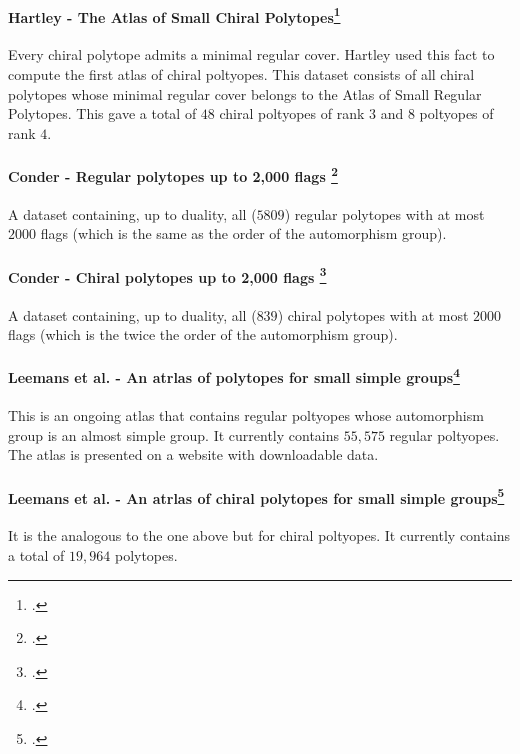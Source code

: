 \paragraph{Hartley - The Atlas of Small Chiral Polytopes\footcite{Hartley_2006_AtlasSmallChiral}} Every chiral polytope admits a minimal regular cover. Hartley used this fact to compute the first atlas of chiral poltyopes. This dataset consists of all chiral polytopes whose minimal regular cover belongs to the Atlas of Small Regular Polytopes. This gave a total of $48$ chiral poltyopes of rank $3$ and $8$ poltyopes of rank $4$.

\paragraph{Conder - Regular polytopes up to 2,000 flags \footcite{Conder_2012_RegularPolytopes2000}} A dataset containing, up to duality, all ($5809$) regular polytopes with at most $2000$ flags (which is the same as the order of the automorphism group).

\paragraph{Conder - Chiral polytopes up to 2,000 flags \footcite{Conder_2012_ChiralPolytopes2000}} A dataset containing, up to duality, all ($839$) chiral polytopes with at most $2000$ flags (which is the twice the order  of the automorphism group).


\paragraph{Leemans et al. - An atrlas of polytopes for small simple groups\footcite{LeemansLaurenceConnorMixerMulpas__AtlasPolytopesSmall}} This is an ongoing atlas that contains regular poltyopes whose automorphism group is an almost simple group. It currently contains $55,575$ regular poltyopes. The atlas is presented on a website with downloadable data.

\paragraph{Leemans et al. - An atrlas of chiral polytopes for small simple groups\footcite{HartleyHubardLeemans__AtlasChiralPolytopes}} It is the analogous to the one above but for chiral poltyopes. It currently contains a total of $19,964$ polytopes.

